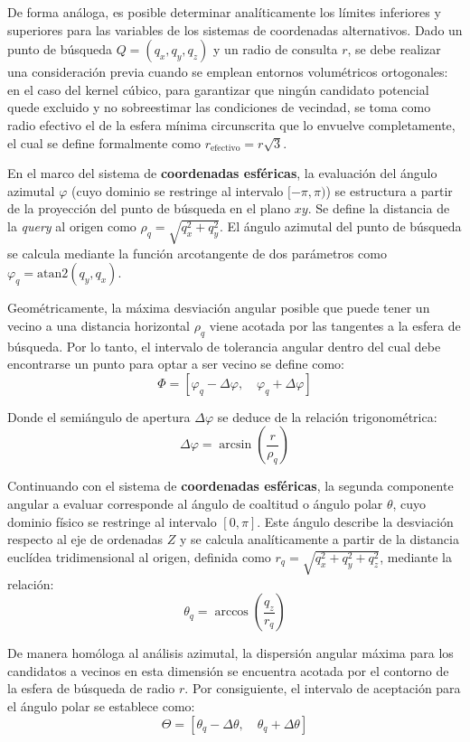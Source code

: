De forma análoga, es posible determinar analíticamente los límites inferiores y superiores para las variables de los sistemas de coordenadas alternativos. Dado un punto de búsqueda $Q = (q_x, q_y, q_z)$ y un radio de consulta $r$, se debe realizar una consideración previa cuando se emplean entornos volumétricos ortogonales: en el caso del kernel cúbico, para garantizar que ningún candidato potencial quede excluido y no sobreestimar las condiciones de vecindad, se toma como radio efectivo el de la esfera mínima circunscrita que lo envuelve completamente, el cual se define formalmente como $r_{\text{efectivo}} = r\sqrt{3}$.

En el marco del sistema de \textbf{coordenadas esféricas}, la evaluación del ángulo azimutal $\varphi$ (cuyo dominio se restringe al intervalo $[-\pi, \pi)$) se estructura a partir de la proyección del punto de búsqueda en el plano $xy$. Se define la distancia de la \textit{query} al origen como $\rho_q = \sqrt{q_x^2 + q_y^2}$. El ángulo azimutal del punto de búsqueda se calcula mediante la función arcotangente de dos parámetros como $\varphi_q = \text{atan2}(q_y, q_x)$.

Geométricamente, la máxima desviación angular posible que puede tener un vecino a una distancia horizontal $\rho_q$ viene acotada por las tangentes a la esfera de búsqueda. Por lo tanto, el intervalo de tolerancia angular dentro del cual debe encontrarse un punto para optar a ser vecino se define como:
\[ \Phi = [\varphi_q - \Delta\varphi, \quad \varphi_q + \Delta\varphi] \]

Donde el semiángulo de apertura $\Delta\varphi$ se deduce de la relación trigonométrica:
\[ \Delta\varphi = \arcsin\left(\frac{r}{\rho_q}\right) \]

Continuando con el sistema de \textbf{coordenadas esféricas}, la segunda componente angular a evaluar corresponde al ángulo de coaltitud o ángulo polar $\theta$, cuyo dominio físico se restringe al intervalo $[0, \pi]$. Este ángulo describe la desviación respecto al eje de ordenadas $Z$ y se calcula analíticamente a partir de la distancia euclídea tridimensional al origen, definida como $r_q = \sqrt{q_x^2 + q_y^2 + q_z^2}$, mediante la relación:
\[ \theta_q = \arccos\left(\frac{q_z}{r_q}\right) \]

De manera homóloga al análisis azimutal, la dispersión angular máxima para los candidatos a vecinos en esta dimensión se encuentra acotada por el contorno de la esfera de búsqueda de radio $r$. Por consiguiente, el intervalo de aceptación para el ángulo polar se establece como:
\[ \Theta = [\theta_q - \Delta\theta, \quad \theta_q + \Delta\theta] \]

